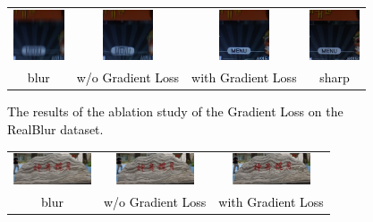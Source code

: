 \begin{sloppypar}
\begin{figure}
        \center
        \scriptsize
        \begin{tabular}{cccc}
                \includegraphics[width=1.5cm]{./loss/blur.png} &    \includegraphics[width=1.5cm]{./loss/wo.png}  &
                 \includegraphics[width=1.5cm]{./loss/w.png} &    \includegraphics[width=1.5cm]{./loss/GT.png}\\
                \textcolor{black}{blur} & \textcolor{black}{w/o Gradient Loss} &  \textcolor{black}{with Gradient Loss} & \textcolor{black}{sharp}\\
                
        \end{tabular}
        
        \caption{\textcolor{black}{The results of the ablation study of the Gradient Loss on the RealBlur dataset.}}
        \label{figure13}
        \vspace{-0.5em}
\end{figure}

\begin{figure}
        \center
        \scriptsize
        \begin{tabular}{ccc}
                \includegraphics[width=2.3cm]{./loss/blur1.png}  &
                \includegraphics[width=2.3cm]{./loss/wo1.png} & 
                \includegraphics[width=2.3cm]{./loss/w1.png}  \\
                \textcolor{black}{blur} & \textcolor{black}{w/o Gradient Loss} &  \textcolor{black}{with Gradient Loss}\\
                

\end{tabular}
\end{figure}
\end{sloppypar}
